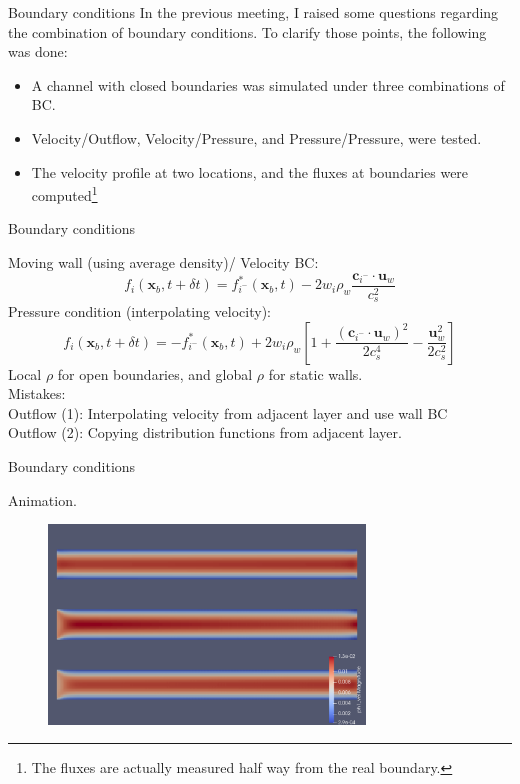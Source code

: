 \documentclass[8pt]{beamer}
\begin{document}
	\begin{frame}{Boundary conditions}
		In the previous meeting, I raised some questions regarding the combination of boundary conditions. To clarify those points, the following was done:
		
		\begin{itemize}
			\item A channel with closed boundaries was simulated under three combinations of BC.
			\item Velocity/Outflow, Velocity/Pressure, and Pressure/Pressure, were tested.
			\item The velocity profile at two locations, and the fluxes at boundaries were computed\footnote{The fluxes are actually measured half way from the real boundary.}
		\end{itemize}
	\end{frame}
	
	\begin{frame}{Boundary conditions}
		
		Moving wall (using average density)/ Velocity BC:
		\begin{equation*}
		f_{i}(\mathbf{x}_b,t+\delta t) = f^*_{i^-}(\mathbf{x}_b,t) - 2 w_i \rho_w \frac{\mathbf{c}_{i^-} \cdot \mathbf{u}_w}{c_s^2}
		\end{equation*}
		Pressure condition (interpolating velocity):
		\begin{equation*}
		f_{i}(\mathbf{x}_b,t + \delta t) = - f^*_{i^-}(\mathbf{x}_b,t) + 2 w_i \rho_w \left[1+\frac{(\mathbf{c}_{i^-} \cdot \mathbf{u}_w)^2}{2c_s^4} - \frac{\mathbf{u}^2_w}{2c^2_s} \right]
		\end{equation*}
		Local $\rho$ for open boundaries, and global $\rho$ for static walls.\\
		{\color{red}
			Mistakes:\\
			Outflow (1): Interpolating velocity from adjacent layer and use wall BC\\
			Outflow (2): Copying distribution functions from adjacent layer. }
		
	\end{frame}
	
	
	\begin{frame}{Boundary conditions}
		
		Animation.
		\begin{figure}
			\centering
			\includegraphics[width=0.75\textwidth]{pics/channelBCComparision.png}
		\end{figure}
	\end{frame}
	
\end{document}
